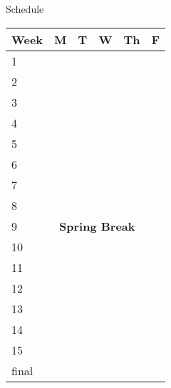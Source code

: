 \documentclass[12pt]{article}
\begin{document}
\renewcommand{\d}{\displaystyle}

\centerline{Schedule}

\begin{tabularx}{\textwidth}{X|X|X|X|X|X|}
Week & M & T & W & Th & F \\ \hline
1 &  &  &  &  & \\ \hline
2 &  &  &  &  & \\ \hline
3 &  &  &  &  & \\ \hline
4 &  &  &  &  & \\ \hline
5 &  &  &  &  & \\ \hline
6 &  &  &  &  & \\ \hline
7 &  &  &  &  & \\ \hline
8 &  &  &  &  & \\ \hline
9 &  \multicolumn{4}{c}{\textbf{Spring Break}} & \\ \hline
10 &  &  &  &  & \\ \hline
11 &  &  &  &  & \\ \hline
12 &  &  &  &  & \\ \hline
13 &  &  &  &  & \\ \hline
14 &  &  &  &  & \\ \hline
15 &  &  &  &  & \\ \hline
final &  &  &  &  & 
\end{tabularx}
\end{document}
